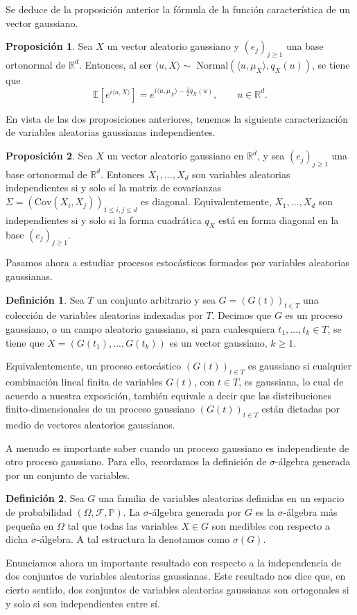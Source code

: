 \documentclass[letterpaper,twoside,12pt]{book}
\newcommand{\R}{\mathbb{R}}
\newcommand{\F}{\mathcal{F}}
\newcommand{\E}{\mathbb{E}}
\renewcommand{\P}{\mathbb{P}}
\newcommand{\1}{\mathds{1}}
\theoremstyle{definition}
\newtheorem{dfn}{Definición}
\theoremstyle{definition}
\theoremstyle{remark}
\theoremstyle{definition}
\theoremstyle{definition}
\newtheorem{prop}{Proposición}
\theoremstyle{definition}
\theoremstyle{definition}
\theoremstyle{definition}
\begin{document}
Se deduce de la proposición anterior la fórmula de la función característica de un vector gaussiano.
\begin{prop} 
 Sea $X$ un vector aleatorio gaussiano y $(e_j)_{j\geq1}$ una base ortonormal de $\R^{d}$. Entonces, al ser $\langle u,X\rangle\sim$ Normal$(\langle u,\mu_X\rangle,q_X(u))$, se tiene que %
 \[
 \E\left[e^{i\langle u,X\rangle}\right]=e^{i \langle u,\mu_X\rangle-\frac{1}{2}q_X(u)}, \qquad u\in \R^d.
 \]
 \end{prop}
En vista de las dos proposiciones anteriores, tenemos la siguiente caracterización de variables aleatorias gaussianas independientes.
\begin{prop} 
 Sea $X$ un vector aleatorio gaussiano en $\R^{d}$, y sea $(e_j)_{j\geq1}$ una base ortonormal de $\R^{d}$. Entonces $X_1,...,X_d$ son variables aleatorias independientes si y solo sí la matriz de covarianzas $\Sigma=(\text{Cov}\left(X_i,X_j\right))_{1\leq i,j\leq d}$ es diagonal. Equivalentemente, $X_1,...,X_d$ son independientes si y solo si la forma cuadrática $q_X$ está en forma diagonal en la base $(e_j)_{j\geq1}$.
 \end{prop}

 Pasamos ahora a estudiar procesos estocásticos formados por variables aleatorias gaussianas.
\begin{dfn} 
 Sea $T$ un conjunto arbitrario y sea $G=(G(t))_{t\in T}$ una colección de variables aleatorias indexadas por $T$. Decimos que $G$ es un proceso gaussiano, o un campo aleatorio gaussiano, si para cualesquiera $t_1,...,t_k\in T$, se tiene que $X=(G(t_1),...,G(t_k))$ es un vector gaussiano, $k\geq1$. 
\end{dfn}

Equivalentemente, un proceso estocástico $(G(t))_{t\in T}$ es gaussiano si cualquier combinación lineal finita de variables $G(t)$, con $t\in T$, es gaussiana, lo cual de acuerdo a nuestra exposición, también equivale a decir que las distribuciones finito-dimensionales de un proceso gaussiano $(G(t))_{t\in T}$ están dictadas por medio de vectores aleatorios gaussianos.

A menudo es importante saber cuando un proceso gaussiano es independiente de otro proceso gaussiano. Para ello, recordamos la definición de $\sigma$-álgebra generada por un conjunto de variables.

\begin{dfn} 
 Sea $G$ una familia de variables aleatorias definidas en un espacio de probabilidad $(\Omega, \F, \P)$. La $\sigma$-álgebra generada por $G$ es la $\sigma$-álgebra más pequeña en $\Omega$ tal que todas las variables $X\in G$ son medibles con respecto a dicha $\sigma$-álgebra. A tal estructura la denotamos como $\sigma(G)$.  
 \end{dfn}
Enunciamos ahora un importante resultado con respecto a la independencia de dos conjuntos de variables aleatorias gaussianas. Este resultado nos dice que, en cierto sentido, dos conjuntos de variables aleatorias gaussianas son ortogonales si y solo si son independientes entre sí. 
\end{document}
